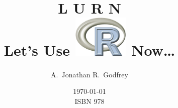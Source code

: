 \documentclass[a4paper,12pt,openany,english]{book}
\begin{document}
\pagestyle{empty}
\title{L U R N\\[15mm]Let's Use \includegraphics[width=0.2\textwidth, alt={R}]{Other/rlogo}  Now\ldots {}}
\author{A.\ Jonathan R.\ Godfrey}
\date{\today \\
ISBN 978}
\maketitle \pagebreak

\frontmatter \pagestyle{plain} 
\clearpage
\tableofcontents


\mainmatter
\pagestyle{headings}




\printindex
\end{document}
